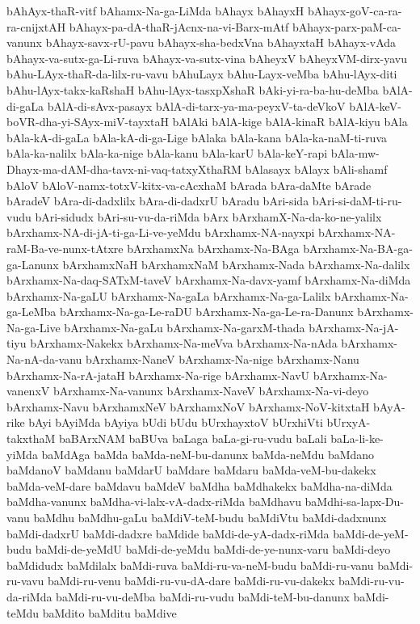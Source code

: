 {bAhAyx-thaR-vitf
bAhamx-Na-ga-LiMda
bAhayx
bAhayxH
bAhayx-goV-ca-ra-ra-cnijxtAH
bAhayx-pa-dA-thaR-jAcnx-na-vi-Barx-mAtf
bAhayx-parx-paM-ca-vanunx
bAhayx-savx-rU-pavu
bAhayx-sha-bedxVna
bAhayxtaH
bAhayx-vAda
bAhayx-va-sutx-ga-Li-ruva
bAhayx-va-sutx-vina
bAheyxV
bAheyxVM-dirx-yavu
bAhu-LAyx-thaR-da-lilx-ru-vavu
bAhuLayx
bAhu-Layx-veMba
bAhu-lAyx-diti
bAhu-lAyx-takx-kaRshaH
bAhu-lAyx-tasxpXshaR
bAki-yi-ra-ba-hu-deMba
bAlA-di-gaLa
bAlA-di-sAvx-pasayx
bAlA-di-tarx-ya-ma-peyxV-ta-deVkoV
bAlA-keV-boVR-dha-yi-SAyx-miV-tayxtaH
bAlAki
bAlA-kige
bAlA-kinaR
bAlA-kiyu
bAla
bAla-kA-di-gaLa
bAla-kA-di-ga-Lige
bAlaka
bAla-kana
bAla-ka-naM-ti-ruva
bAla-ka-nalilx
bAla-ka-nige
bAla-kanu
bAla-karU
bAla-keY-rapi
bAla-mw-Dhayx-ma-dAM-dha-tavx-ni-vaq-tatxyXthaRM
bAlasayx
bAlayx
bAli-shamf
bAloV
bAloV-namx-totxV-kitx-va-cAcxhaM
bArada
bAra-daMte
bArade
bAradeV
bAra-di-dadxlilx
bAra-di-dadxrU
bAradu
bAri-sida
bAri-si-daM-ti-ru-vudu
bAri-sidudx
bAri-su-vu-da-riMda
bArx
bArxhamX-Na-da-ko-ne-yalilx
bArxhamx-NA-di-jA-ti-ga-Li-ve-yeMdu
bArxhamx-NA-nayxpi
bArxhamx-NA-raM-Ba-ve-nunx-tAtxre
bArxhamxNa
bArxhamx-Na-BAga
bArxhamx-Na-BA-ga-ga-Lanunx
bArxhamxNaH
bArxhamxNaM
bArxhamx-Nada
bArxhamx-Na-dalilx
bArxhamx-Na-daq-SATxM-taveV
bArxhamx-Na-davx-yamf
bArxhamx-Na-diMda
bArxhamx-Na-gaLU
bArxhamx-Na-gaLa
bArxhamx-Na-ga-Lalilx
bArxhamx-Na-ga-LeMba
bArxhamx-Na-ga-Le-raDU
bArxhamx-Na-ga-Le-ra-Danunx
bArxhamx-Na-ga-Live
bArxhamx-Na-gaLu
bArxhamx-Na-garxM-thada
bArxhamx-Na-jA-tiyu
bArxhamx-Nakekx
bArxhamx-Na-meVva
bArxhamx-Na-nAda
bArxhamx-Na-nA-da-vanu
bArxhamx-NaneV
bArxhamx-Na-nige
bArxhamx-Nanu
bArxhamx-Na-rA-jataH
bArxhamx-Na-rige
bArxhamx-NavU
bArxhamx-Na-vanenxV
bArxhamx-Na-vanunx
bArxhamx-NaveV
bArxhamx-Na-vi-deyo
bArxhamx-Navu
bArxhamxNeV
bArxhamxNoV
bArxhamx-NoV-kitxtaH
bAyA-rike
bAyi
bAyiMda
bAyiya
bUdi
bUdu
bUrxhayxtoV
bUrxhiVti
bUrxyA-takxthaM
baBArxNAM
baBUva
baLaga
baLa-gi-ru-vudu
baLali
baLa-li-ke-yiMda
baMdAga
baMda
baMda-neM-bu-danunx
baMda-neMdu
baMdano
baMdanoV
baMdanu
baMdarU
baMdare
baMdaru
baMda-veM-bu-dakekx
baMda-veM-dare
baMdavu
baMdeV
baMdha
baMdhakekx
baMdha-na-diMda
baMdha-vanunx
baMdha-vi-lalx-vA-dadx-riMda
baMdhavu
baMdhi-sa-lapx-Du-vanu
baMdhu
baMdhu-gaLu
baMdiV-teM-budu
baMdiVtu
baMdi-dadxnunx
baMdi-dadxrU
baMdi-dadxre
baMdide
baMdi-de-yA-dadx-riMda
baMdi-de-yeM-budu
baMdi-de-yeMdU
baMdi-de-yeMdu
baMdi-de-ye-nunx-varu
baMdi-deyo
baMdidudx
baMdilalx
baMdi-ruva
baMdi-ru-va-neM-budu
baMdi-ru-vanu
baMdi-ru-vavu
baMdi-ru-venu
baMdi-ru-vu-dA-dare
baMdi-ru-vu-dakekx
baMdi-ru-vu-da-riMda
baMdi-ru-vu-deMba
baMdi-ru-vudu
baMdi-teM-bu-danunx
baMdi-teMdu
baMdito
baMditu
baMdive
}

